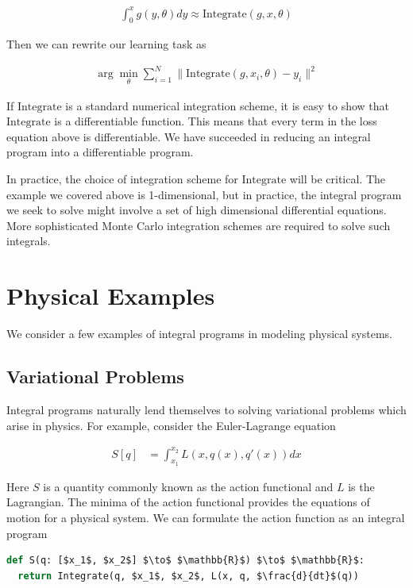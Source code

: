 \documentclass[book.tex]{subfiles}
\begin{document}
\begin{align} 
\int_0^x g(y, \theta) dy \approx \textrm{Integrate}(g, x, \theta) 
\end{align}

Then we can rewrite our learning task as

\begin{align}
    \arg\min_{\theta} \sum_{i=1}^N \| \textrm{Integrate}(g, x_i, \theta) - y_i\|^2
\end{align}

If $\textrm{Integrate}$ is a standard numerical integration scheme, it is easy to show that $\textrm{Integrate}$ is a differentiable function. This means that every term in the loss equation above is differentiable. We have succeeded in reducing an integral program into a differentiable program.

In practice, the choice of integration scheme for $\textrm{Integrate}$ will be critical. The example we covered above is 1-dimensional, but in practice, the integral program we seek to solve might involve a set of high dimensional differential equations. More sophisticated Monte Carlo integration schemes are required to solve such integrals.

\section{Physical Examples}
We consider a few examples of integral programs in modeling physical systems.

\subsection{Variational Problems}

Integral programs naturally lend themselves to solving variational problems which arise in physics. For example, consider the Euler-Lagrange equation

\begin{align}
    S[q] &= \int_{x_1}^{x_2} L(x, q(x), q'(x)) dx
\end{align}

Here $S$ is a quantity commonly known as the action functional and $L$ is the Lagrangian. The minima of the action functional provides the equations of motion for a physical system. We can formulate the action function as an integral program

\begin{lstlisting}[language=python]
def S(q: [$x_1$, $x_2$] $\to$ $\mathbb{R}$) $\to$ $\mathbb{R}$:
  return Integrate(q, $x_1$, $x_2$, L(x, q, $\frac{d}{dt}$(q))
\end{lstlisting}
\end{document}
